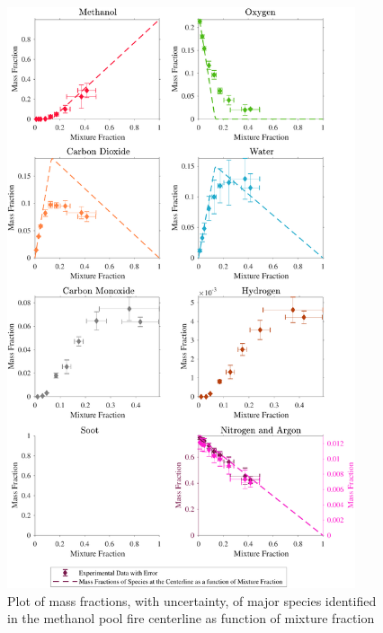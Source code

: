 \documentclass[12pt]{article}
\begin{document}
\begin{figure}[!h]
	\centering
\includegraphics[width=10.25cm,keepaspectratio]{Methanol_Mixture_Fraction_Major_Plot.pdf}
	\caption[Species mass fractions superimposed on methanol state relations]{Plot of mass fractions, with uncertainty, of major species identified in the methanol pool fire centerline as function of mixture fraction}
	\label{fig:Methanol_MIX_Frac_Major}
\end{figure}

\pagebreak
\end{document}
